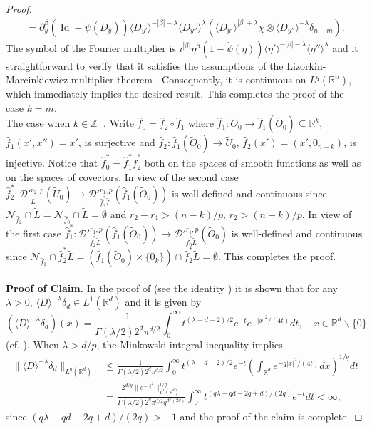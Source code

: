 \documentclass[12pt,reqno]{amsart}
\newcommand{\RR}{\mathbb R}
\newcommand{\ZZ}{\mathbb Z}
\newcommand{\DD}{\mathcal D}
\theoremstyle{plain}
\theoremstyle{remark}
\theoremstyle{definition}
\numberwithin{equation}{section}
\begin{document}
\begin{proof}
\begin{multline*}
=\partial^{\beta}_y(\operatorname{Id}-\check{\psi}(D_y))\langle D_{y'}\rangle^{-|\beta|-\lambda}\langle D_{y''}\rangle^{\lambda}(\langle D_{y'}\rangle^{|\beta|+\lambda}\chi\otimes\langle D_{y''}\rangle^{-\lambda}\delta_{n-m}).
\end{multline*}
The symbol of the Fourier multiplier is $i^{|\beta|}\eta^{\beta}(1-\check{\psi}(\eta))\langle \eta'\rangle^{-|\beta|-\lambda}\langle\eta''\rangle^{\lambda}$ and it straightforward to verify that it satisfies the assumptions of the Lizorkin-Marcinkiewicz multiplier theorem \cite[Corollary 6.2.5, p. 444]{Grafakos}. Consequently, it is continuous on $L^q(\RR^n)$, which immediately implies the desired result. This completes the proof of the case $k=m$.\\
\indent \underline{The case when $k\in\ZZ_+$.} Write $\hat{f}_0=\hat{f}_2\circ\hat{f}_1$ where $\hat{f}_1:\widetilde{O}_0\rightarrow\hat{f}_1(\widetilde{O}_0)\subseteq \RR^k$, $\hat{f}_1(x',x'')=x'$, is surjective and $\hat{f}_2:\hat{f}_1(\widetilde{O}_0)\rightarrow \widetilde{U}_0$, $\hat{f}_2(x')=(x',0_{n-k})$, is injective. Notice that $\hat{f}^*_0=\hat{f}^*_1\hat{f}^*_2$ both on the spaces of smooth functions as well as on the spaces of covectors. In view of the second case $\hat{f}^*_2:\DD'^{r_2,p}_{\widetilde{L}}(\widetilde{U}_0)\rightarrow\DD'^{r_1,p}_{\hat{f}^*_2\widetilde{L}}(\hat{f}_1(\widetilde{O}_0))$ is well-defined and continuous since $\mathcal{N}_{\hat{f}_2}\cap \widetilde{L}=\mathcal{N}_{\hat{f}_0}\cap \widetilde{L}=\emptyset$ and $r_2-r_1>(n-k)/p$, $r_2>(n-k)/p$. In view of the first case $\hat{f}^*_1:\DD'^{r_1,p}_{\hat{f}^*_2\widetilde{L}}(\hat{f}_1(\widetilde{O}_0))\rightarrow \DD'^{r_1,p}_{\hat{f}^*_0\widetilde{L}}(\widetilde{O}_0)$ is well-defined and continuous since $\mathcal{N}_{\hat{f}_1}\cap \hat{f}^*_2\widetilde{L}=(\hat{f}_1(\widetilde{O}_0)\times\{0_k\})\cap \hat{f}^*_2\widetilde{L}=\emptyset$. This completes the proof.\\
\\
\noindent \textbf{Proof of Claim.} In the proof of \cite[Proposition A.1]{PP} (see the identity \cite[(A.2)]{PP}) it is shown that for any $\lambda>0$, $\langle D\rangle^{-\lambda}\delta_d\in L^1(\RR^d)$ and it is given by
\begin{equation*}
(\langle D\rangle^{-\lambda}\delta_d)(x)=\frac{1}{\Gamma(\lambda/2)2^d\pi^{d/2}}\int_0^{\infty}t^{(\lambda-d-2)/2}e^{-t} e^{-|x|^2/(4t)} dt,\quad x\in\RR^d\backslash\{0\}
\end{equation*}
(cf. \cite[Proposition 2, p. 132]{stein}). When $\lambda>d/p$, the Minkowski integral inequality implies
\begin{align*}
\|\langle D\rangle^{-\lambda}\delta_d\|_{L^q(\RR^d)}&\leq \frac{1}{\Gamma(\lambda/2)2^d\pi^{d/2}}\int_0^{\infty}t^{(\lambda-d-2)/2}e^{-t} \left(\int_{\RR^d}e^{-q|x|^2/(4t)}dx\right)^{1/q} dt\\
&=\frac{2^{d/q}\|e^{-|\cdot|^2}\|_{L^1(\RR^d)}^{1/q}}{\Gamma(\lambda/2)2^d\pi^{d/2}q^{d/(2q)}}\int_0^{\infty}t^{(q\lambda-qd-2q+d)/(2q)}e^{-t} dt<\infty,
\end{align*}
since $(q\lambda-qd-2q+d)/(2q)>-1$ and the proof of the claim is complete.
\end{proof}
\end{document}
